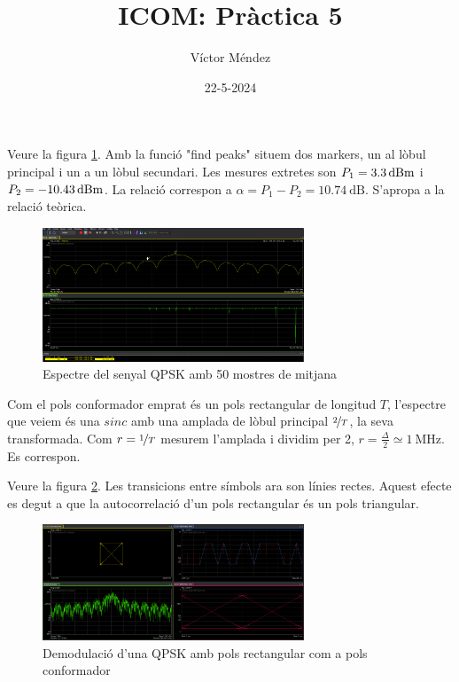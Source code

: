 \documentclass[catalan, a4paper, nobib]{tufte-handout}
\author{Víctor Méndez}
\title{ICOM: Pràctica 5}
\date{22-5-2024}
\begin{document}
\maketitle


Veure la figura \ref{fig:1}. Amb la funció "find peaks" situem dos markers, un al lòbul principal i un a un lòbul secundari. Les mesures extretes son $P_1=\qty[qualifier-mode=combine]{3.3}{\deci\bel\of{m}}$ i $P_2=\qty[qualifier-mode=combine]{-10.43}{\deci\bel\of{m}}$. La relació correspon a $\alpha=P_1-P_2=\qty{10.74}{\deci\bel}$. S'apropa a la relació teòrica.

\begin{figure}
    \begin{center}
        \includegraphics[width=295px]{1.png}
    \end{center}
    \caption{Espectre del senyal QPSK amb \num{50} mostres de mitjana}
    \label{fig:1}
\end{figure}

Com el pols conformador emprat és un pols rectangular de longitud $T$, l'espectre que veiem és una $sinc$ amb una amplada de lòbul principal $\nicefrac{2}{T}$, la seva transformada. Com $r=\nicefrac{1}{T}$ mesurem l'amplada i dividim per \num{2}, $r = \frac{\Delta}{2} \simeq \qty{1}{\mega\hertz}$. Es correspon.


Veure la figura \ref{fig:2}. Les transicions entre símbols ara son línies rectes. Aquest efecte es degut a que la autocorrelació d'un pols rectangular és un pols triangular.

\begin{figure}
    \begin{center}
        \includegraphics[width=295px]{2.png}
    \end{center}
    \caption{Demodulació d'una QPSK amb pols rectangular com a pols conformador}
    \label{fig:2}
\end{figure}
\end{document}
